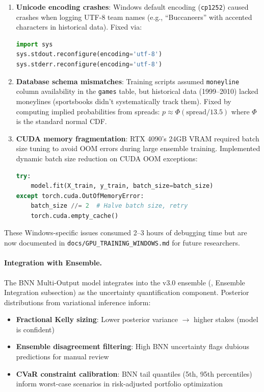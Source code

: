 \begin{enumerate}
  \item \textbf{Unicode encoding crashes}: Windows default encoding (\texttt{cp1252}) caused crashes when logging UTF-8 team names (e.g., ``Buccaneers'' with accented characters in historical data). Fixed via:
  \begin{lstlisting}[language=Python,basicstyle=\ttfamily\scriptsize]
import sys
sys.stdout.reconfigure(encoding='utf-8')
sys.stderr.reconfigure(encoding='utf-8')
  \end{lstlisting}

  \item \textbf{Database schema mismatches}: Training scripts assumed \texttt{moneyline} column availability in the \texttt{games} table, but historical data (1999--2010) lacked moneylines (sportsbooks didn't systematically track them). Fixed by computing implied probabilities from spreads: $p \approx \Phi(\text{spread} / 13.5)$ where $\Phi$ is the standard normal CDF.

  \item \textbf{CUDA memory fragmentation}: RTX 4090's 24GB VRAM required batch size tuning to avoid OOM errors during large ensemble training. Implemented dynamic batch size reduction on CUDA OOM exceptions:
  \begin{lstlisting}[language=Python,basicstyle=\ttfamily\scriptsize]
try:
    model.fit(X_train, y_train, batch_size=batch_size)
except torch.cuda.OutOfMemoryError:
    batch_size //= 2  # Halve batch size, retry
    torch.cuda.empty_cache()
  \end{lstlisting}
\end{enumerate}

These Windows-specific issues consumed 2--3 hours of debugging time but are now documented in \texttt{docs/GPU\_TRAINING\_WINDOWS.md} for future researchers.

\paragraph{Integration with Ensemble.}
The BNN Multi-Output model integrates into the v3.0 ensemble (, Ensemble Integration subsection) as the uncertainty quantification component. Posterior distributions from variational inference inform:
\begin{itemize}
  \item \textbf{Fractional Kelly sizing}: Lower posterior variance $\to$ higher stakes (model is confident)
  \item \textbf{Ensemble disagreement filtering}: High BNN uncertainty flags dubious predictions for manual review
  \item \textbf{CVaR constraint calibration}: BNN tail quantiles (5th, 95th percentiles) inform worst-case scenarios in risk-adjusted portfolio optimization
\end{itemize}


